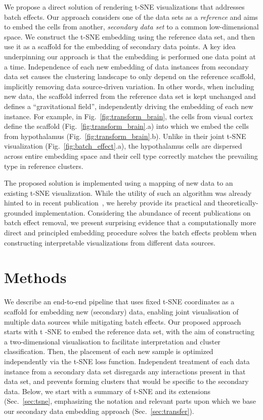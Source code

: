 \documentclass[runningheads]{llncs}
\begin{document}
We propose a direct solution of rendering t-SNE visualizations that addresses
batch effects. Our approach considers one of the data sets as a {\em reference}
and aims to embed the cells from another, {\em secondary data set} to a common low-dimensional space.
We construct the t-SNE embedding using the reference data set, and then use it
as a scaffold for the embedding of secondary data points.
A key idea underpinning our approach is that the embedding is performed one data point at a time. 
Independence of each new
embedding of data instances from secondary data set causes the clustering landscape
to only depend on the reference scaffold, implicitly removing data source-driven
variation. In other words, when including new data, the scaffold inferred from
the reference data set is kept unchanged and defines a ``gravitational
field'', independently driving the embedding of each new instance. For example, in
Fig.~\ref{fig:transform_brain}, the cells from visual cortex define the
scaffold (Fig.~\ref{fig:transform_brain}.a) into which we embed the cells from
hypothalamus (Fig.~\ref{fig:transform_brain}.b). Unlike in their joint t-SNE
visualization (Fig.~\ref{fig:batch_effect}.a), the hypothalamus cells are
dispersed across entire embedding space and their cell type correctly matches
the prevailing type in reference clusters.

The proposed solution is implemented using a mapping of
new data to an existing t-SNE visualization. While the 
utility of such an algorithm was already hinted to in recent
publication~\cite{art_of_using_tsne}, we hereby provide its practical and
theoretically-grounded implementation. Considering the abundance of recent
publications on batch effect removal, we present surprising evidence that a
computationally more direct and principled embedding procedure solves the batch
effects problem when constructing interpretable visualizations from different
data sources.


\section{Methods}

We describe an end-to-end pipeline that uses fixed t-SNE coordinates as a scaffold for
embedding new (secondary) data, enabling joint visualisation of multiple data sources
while mitigating batch effects. Our proposed approach starts with t\nobreakdash
-SNE to embed the reference data set, with the aim of constructing a
two-dimensional visualisation to facilitate interpretation and cluster
classification. Then, the placement of each new sample is
optimized independently via the
t\nobreakdash -SNE loss function. Independent treatment of each data instance from
a secondary data set disregards any interactions present in that data set, and
prevents forming clusters that would be specific to the secondary data. Below, we start
with a summary of t-SNE and its extensions (Sec.~\ref{sec:tsne}, emphasizing
the notation and relevant parts upon which we base our secondary data embedding
approach (Sec.~\ref{sec:transfer}).
\end{document}
